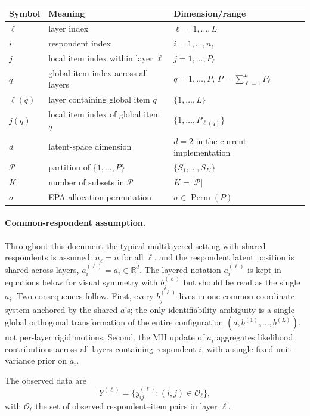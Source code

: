\documentclass[11pt]{article}
\newcommand{\R}{\mathbb R}
\DeclareMathOperator{\Perm}{Perm}
\begin{document}
\begin{center}
\begin{tabular}{lll}
\toprule
Symbol & Meaning & Dimension/range \\
\midrule
$\ell$ & layer index & $\ell=1,\dots,L$ \\
$i$ & respondent index & $i=1,\dots,n_\ell$ \\
$j$ & local item index within layer $\ell$ & $j=1,\dots,P_\ell$ \\
$q$ & global item index across all layers & $q=1,\dots,P$, $P=\sum_{\ell=1}^L P_\ell$ \\
$\ell(q)$ & layer containing global item $q$ & $\{1,\dots,L\}$ \\
$j(q)$ & local item index of global item $q$ & $\{1,\dots,P_{\ell(q)}\}$ \\
$d$ & latent-space dimension & $d=2$ in the current implementation \\
$\mathcal{P}$ & partition of $\{1,\dots,P\}$ & $\{S_1,\dots,S_K\}$ \\
$K$ & number of subsets in $\mathcal{P}$ & $K=|\mathcal{P}|$ \\
$\sigma$ & EPA allocation permutation & $\sigma\in\Perm(P)$ \\
\bottomrule
\end{tabular}
\end{center}

\paragraph{Common-respondent assumption.}
Throughout this document the typical multilayered setting with shared
respondents is assumed: $n_\ell=n$ for all $\ell$, and the respondent latent
position is shared across layers, $a_i^{(\ell)}=a_i\in\R^d$.  The layered
notation $a_i^{(\ell)}$ is kept in equations below for visual symmetry with
$b_j^{(\ell)}$ but should be read as the single $a_i$.  Two consequences
follow.  First, every $b_j^{(\ell)}$ lives in one common coordinate system
anchored by the shared $a$'s; the only identifiability ambiguity is a single
global orthogonal transformation of the entire configuration
$(a, b^{(1)},\dots,b^{(L)})$, not per-layer rigid motions.  Second, the MH
update of $a_i$ aggregates likelihood contributions across all layers
containing respondent $i$, with a single fixed unit-variance prior on $a_i$.

The observed data are
\[
    Y^{(\ell)}=\{y_{ij}^{(\ell)}:(i,j)\in\mathcal O_\ell\},
\]
with $\mathcal O_\ell$ the set of observed respondent--item pairs in layer
$\ell$.
\end{document}
